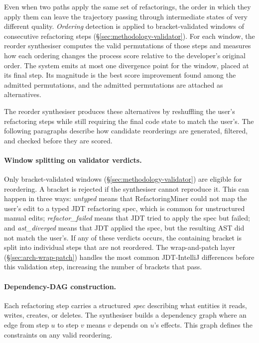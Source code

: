 Even when two paths apply the same set of refactorings, the order in which they apply them can leave the trajectory passing through intermediate states of very different quality. \emph{Ordering} detection is applied to bracket-validated windows of consecutive refactoring steps (\S\ref{sec:methodology-validator}). For each window, the reorder synthesiser computes the valid permutations of those steps and measures how each ordering changes the process score relative to the developer's original order. The system emits at most one divergence point for the window, placed at its final step. Its magnitude is the best score improvement found among the admitted permutations, and the admitted permutations are attached as alternatives.

The reorder synthesiser produces these alternatives by reshuffling the user's refactoring steps while still requiring the final code state to match the user's. The following paragraphs describe how candidate reorderings are generated, filtered, and checked before they are scored.

\paragraph{Window splitting on validator verdicts.}
Only bracket-validated windows (\S\ref{sec:methodology-validator}) are eligible for reordering. A bracket is rejected if the synthesiser cannot reproduce it. This can happen in three ways: \emph{untyped} means that RefactoringMiner could not map the user's edit to a typed JDT refactoring spec, which is common for unstructured manual edits; \emph{refactor\_failed} means that JDT tried to apply the spec but failed; and \emph{ast\_diverged} means that JDT applied the spec, but the resulting AST did not match the user's. If any of these verdicts occurs, the containing bracket is split into individual steps that are not reordered. The wrap-and-patch layer (\S\ref{sec:arch-wrap-patch}) handles the most common JDT-IntelliJ differences before this validation step, increasing the number of brackets that pass.

\paragraph{Dependency-DAG construction.}
Each refactoring step carries a structured \emph{spec} describing what entities it reads, writes, creates, or deletes. The synthesiser builds a dependency graph where an edge from step $u$ to step $v$ means $v$ depends on $u$'s effects. This graph defines the constraints on any valid reordering.

